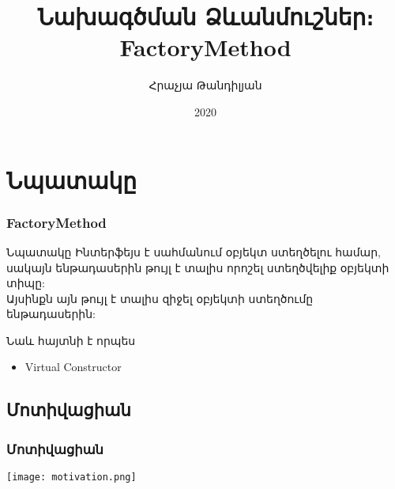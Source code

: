 \documentclass{beamer}
\begin{document}
\title[FactoryMethod]{Նախագծման Ձևանմուշներ։ FactoryMethod}
\author[Հրաչյա Թանդիլյան\copyright]{Հրաչյա Թանդիլյան}
\date{2020}

\begin{frame}
\titlepage
\end{frame}

\section{Նպատակը}
\begin{frame}\frametitle{FactoryMethod}
\begin{block}{Նպատակը}
    Ինտերֆեյս է սահմանում օբյեկտ ստեղծելու համար,
    սակայն ենթադասերին թույլ է տալիս որոշել ստեղծվելիք օբյեկտի տիպը: \\
    \vspace{0.5cm}
    Այսինքն այն թույլ է տալիս զիջել օբյեկտի ստեղծումը ենթադասերին:
\end{block}
\vfill
Նաև հայտնի է որպես
\begin{itemize}
    \item Virtual Constructor
\end{itemize}
\end{frame}

\subsection{Մոտիվացիան}
\begin{frame}\frametitle{Մոտիվացիան}
\begin{center}
    \texttt{[image: motivation.png]}
\end{center}
\end{frame}
\end{document}
